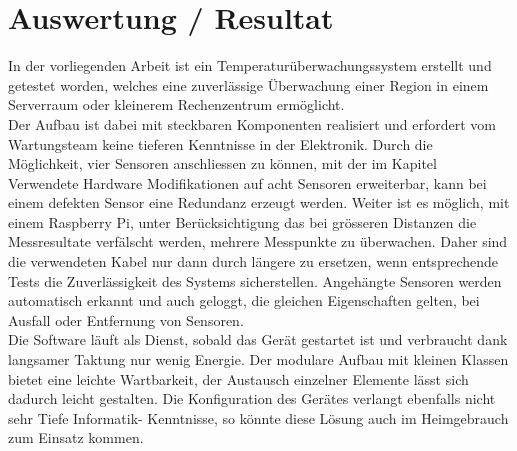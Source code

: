 \section{Auswertung / Resultat}
In der vorliegenden Arbeit ist ein Temperaturüberwachungssystem erstellt und getestet worden, welches eine zuverlässige Überwachung einer Region in einem Serverraum oder kleinerem Rechenzentrum ermöglicht.\\
Der Aufbau ist dabei mit steckbaren Komponenten realisiert und erfordert vom Wartungsteam keine tieferen Kenntnisse in der Elektronik. Durch die Möglichkeit, vier Sensoren anschliessen zu können, mit der im Kapitel \glqq{}Verwendete Hardware\grqq{} Modifikationen auf acht Sensoren erweiterbar, kann bei einem defekten Sensor eine Redundanz erzeugt werden. Weiter ist es möglich, mit einem Raspberry Pi, unter Berücksichtigung das bei grösseren Distanzen die Messresultate verfälscht werden, mehrere Messpunkte zu überwachen. Daher sind die verwendeten Kabel nur dann durch längere zu ersetzen, wenn entsprechende Tests die Zuverlässigkeit des Systems sicherstellen. Angehängte Sensoren werden automatisch erkannt und auch geloggt, die gleichen Eigenschaften gelten, bei Ausfall oder Entfernung von Sensoren.\\
Die Software läuft als Dienst, sobald das Gerät gestartet ist und verbraucht dank langsamer Taktung nur wenig Energie. Der modulare Aufbau mit kleinen Klassen bietet eine leichte Wartbarkeit, der Austausch einzelner Elemente lässt sich dadurch leicht gestalten. Die Konfiguration des Gerätes verlangt ebenfalls nicht sehr Tiefe Informatik- Kenntnisse, so könnte diese Lösung auch im Heimgebrauch zum Einsatz kommen.
\newpage